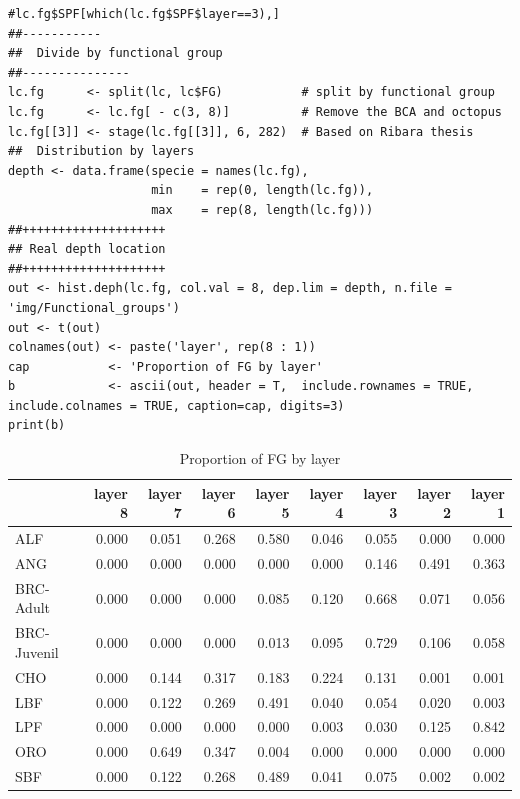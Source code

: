 \documentclass[11pt]{article}
\begin{document}
\begin{itemize}
\begin{itemize}
\begin{itemize}
\begin{verbatim}
#lc.fg$SPF[which(lc.fg$SPF$layer==3),]
##-----------
##  Divide by functional group
##---------------
lc.fg      <- split(lc, lc$FG)           # split by functional group
lc.fg      <- lc.fg[ - c(3, 8)]          # Remove the BCA and octopus
lc.fg[[3]] <- stage(lc.fg[[3]], 6, 282)  # Based on Ribara thesis
##  Distribution by layers
depth <- data.frame(specie = names(lc.fg),
                    min    = rep(0, length(lc.fg)),
                    max    = rep(8, length(lc.fg)))
##++++++++++++++++++++
## Real depth location
##++++++++++++++++++++
out <- hist.deph(lc.fg, col.val = 8, dep.lim = depth, n.file = 'img/Functional_groups')
out <- t(out)
colnames(out) <- paste('layer', rep(8 : 1))
cap           <- 'Proportion of FG by layer'
b             <- ascii(out, header = T,  include.rownames = TRUE, include.colnames = TRUE, caption=cap, digits=3)
print(b)
\end{verbatim}
\begin{table}[htb]
\caption{Proportion of FG by layer}
\begin{center}
\begin{tabular}{lrrrrrrrr}
              &  layer 8  &  layer 7  &  layer 6  &  layer 5  &  layer 4  &  layer 3  &  layer 2  &  layer 1  \\
\hline
 ALF          &    0.000  &    0.051  &    0.268  &    0.580  &    0.046  &    0.055  &    0.000  &    0.000  \\
 ANG          &    0.000  &    0.000  &    0.000  &    0.000  &    0.000  &    0.146  &    0.491  &    0.363  \\
 BRC-Adult    &    0.000  &    0.000  &    0.000  &    0.085  &    0.120  &    0.668  &    0.071  &    0.056  \\
 BRC-Juvenil  &    0.000  &    0.000  &    0.000  &    0.013  &    0.095  &    0.729  &    0.106  &    0.058  \\
 CHO          &    0.000  &    0.144  &    0.317  &    0.183  &    0.224  &    0.131  &    0.001  &    0.001  \\
 LBF          &    0.000  &    0.122  &    0.269  &    0.491  &    0.040  &    0.054  &    0.020  &    0.003  \\
 LPF          &    0.000  &    0.000  &    0.000  &    0.000  &    0.003  &    0.030  &    0.125  &    0.842  \\
 ORO          &    0.000  &    0.649  &    0.347  &    0.004  &    0.000  &    0.000  &    0.000  &    0.000  \\
 SBF          &    0.000  &    0.122  &    0.268  &    0.489  &    0.041  &    0.075  &    0.002  &    0.002  \\

\end{tabular}
\end{center}
\end{table}
\end{itemize}
\end{itemize}
\end{itemize}
\end{document}
